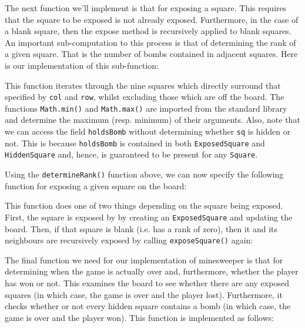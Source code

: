 The next function we'll implement is that for exposing a square.  This requires that the square to be exposed is not already exposed.  Furthermore, in the case of a blank square, then the expose method is recursively applied to blank squares.  An important sub-computation to this process is that of determining the rank of a given square.  That is the number of bombs contained in adjacent squares.  Here is our implementation of this sub-function:



This function iterates through the nine squares which directly surround that specified by \lstinline{col} and \lstinline{row}, whilst excluding those which are off the board.  The functions \lstinline{Math.min()} and \lstinline{Math.max()} are imported from the standard library and determine the maximum (resp. minimum) of their arguments.  Also, note that we can access the field \lstinline{holdsBomb} without determining whether \lstinline{sq} is hidden or not.  This is because \lstinline{holdsBomb} is contained in both \lstinline{ExposedSquare} and \lstinline{HiddenSquare} and, hence, is guaranteed to be present for any \lstinline{Square}.

Using the \lstinline{determineRank()} function above, we can now specify the following function for exposing a given square on the board:



This function does one of two things depending on the square being exposed.  First, the square is exposed by by creating an \lstinline{ExposedSquare} and updating the board.  Then, if that square is blank (i.e. has a rank of zero), then it and its neighbours are recursively exposed by calling \lstinline{exposeSquare()} again:



The final function we need for our implementation of minesweeper is that for determining when the game is actually over and, furthermore, whether the player has won or not.  This examines the board to see whether there are any exposed squares (in which case, the game is over and the player lost).  Furthermore, it checks whether or not every hidden square contains a bomb (in which case, the game is over and the player won).  This function is implemented as follows:



